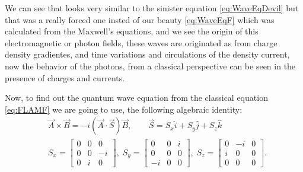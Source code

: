     We can see that looks very similar to the sinister equation \ref{eq:WaveEqDevil} but that was a really forced one insted of our beauty \ref{eq:WaveEqF} which was calculated from the Maxwell's equations, and we see the origin of this electromagnetic or photon fields, these waves are originated as from charge density gradientes, and time variations and circulations of the density current, now the behavior of the photons, from a classical perspective can be seen in the presence of charges and currents.

    Now, to find out the quantum wave equation from the classical equation \ref{eq:FLAMF} we are going to use, the following algebraic identity:
    \begin{align}
        & \vec{A}\times\vec{B} = -i \left(\vec{A}\cdot\vec{S}\right)\vec{B},\qquad \vec{S}= S_x \hat{i} + S_y\hat{j} + S_z\hat{k} \label{eq:IdentityS}\\
        & S_x =
        \begin{bmatrix}
            0 & 0 & 0 \\
            0 & 0 & -i\\
            0 & i & 0
        \end{bmatrix}, \;
        S_y =
        \begin{bmatrix}
            0 & 0 & i\\
            0 & 0 & 0\\
            -i & 0 & 0
        \end{bmatrix},\;
        S_z =
        \begin{bmatrix}
            0 & -i & 0\\
            i & 0 & 0\\
            0 & 0 & 0
        \end{bmatrix}. \nonumber
    \end{align}

